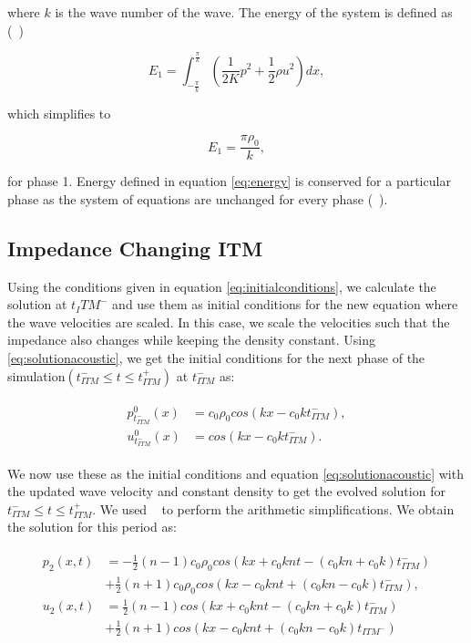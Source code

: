 where $k$ is the wave number of the wave. The energy of the system is defined as (~\parencite{Kopriva2021})

\begin{equation}
     E_1 = \int_{-\frac{\pi}{k}}^{\frac{\pi}{k}} \left(\frac{1}{2K}p^2 + \frac{1}{2}\rho u^2\right) dx,
    \label{eq:energy}
\end{equation}

which simplifies to 

\begin{equation}
    E_1 = \frac{\pi\rho_0}{k},
\end{equation}

for phase 1. Energy defined in equation \ref{eq:energy} is conserved for a particular phase as the system of equations are unchanged for every phase (~\parencite{Kopriva2021}). 

\subsection{Impedance Changing \ac{ITM}}\label{section:impedanceconstantITM}
Using the conditions given in equation \ref{eq:initialconditions}, we calculate the solution at $t_ITM^-$ and use them as initial conditions for the new equation where the wave velocities are scaled.
In this case, we scale the velocities such that the impedance also changes while keeping the density constant. Using \ref{eq:solutionacoustic}, we get the initial conditions for the next phase of the simulation$\left(t_{ITM}^- \leq t \leq t_{ITM}^+ \right)$ at $t_{ITM}^-$ as:

\begin{align}
    \begin{split}
        p^0_{t_{ITM}^-}\left(x\right) &= c_0 \rho_0 cos\left(kx - c_0kt_{ITM}^-\right), \\
        u^0_{t_{ITM}^-}\left(x\right) &= cos\left(kx - c_0kt_{ITM}^-\right) .
    \end{split}
\end{align}

We now use these as the initial conditions and equation \ref{eq:solutionacoustic} with the updated wave velocity and constant density to get the evolved solution for $t_{ITM}^- \leq t \leq t_{ITM}^+ $. We used ~\parencite{sagemath} to perform the arithmetic simplifications. We obtain the solution for this period as:

\begin{align}
    \begin{split}
        p_{2}\left(x, t\right) &= -\frac{1}{2} \left(n-1\right)c_0\rho_0cos\left(kx + c_0knt - \left(c_0kn + c_0k\right)t_{ITM}^-\right) \\
        &+ \frac{1}{2} \left(n+1\right)c_0\rho_0cos\left(kx - c_0knt + \left(c_0kn - c_0k\right)t_{ITM}^-\right), \\
        u_{2}\left(x, t\right) &= \frac{1}{2}\left(n-1\right)cos\left(kx + c_0knt - \left(c_0kn + c_0k\right)t_{ITM}^-\right)\\
        &+ \frac{1}{2}\left(n+1\right)cos\left(kx - c_0knt + \left(c_0kn-c_0k\right)t_{ITM^-}\right)
    \end{split}
\end{align}

